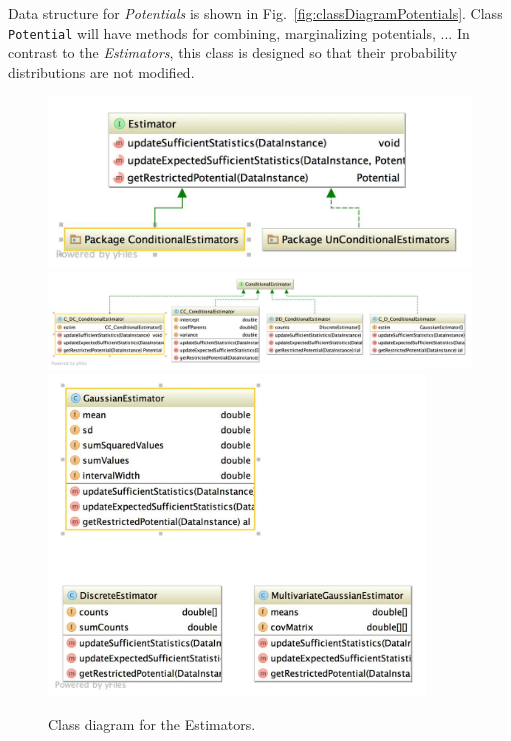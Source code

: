 \documentclass[a4paper,12pt]{article}
\begin{document}
Data structure for \emph{Potentials} is shown in Fig.~\ref{fig:classDiagramPotentials}. Class \texttt{Potential} will have 
methods for combining, marginalizing  potentials, ... In contrast to the \emph{Estimators}, this class is designed so that their 
probability distributions are not modified.

\begin{figure}[h]
\includegraphics[width=14cm]{estimators.jpg}
\includegraphics[width=\textwidth]{conditionalEstimator.jpg}
\includegraphics[width=10cm]{unconditionalEstimator.jpg}
\caption{Class diagram for the Estimators.}
\label{fig:classDiagramEstimators}
\end{figure}
\end{document}
